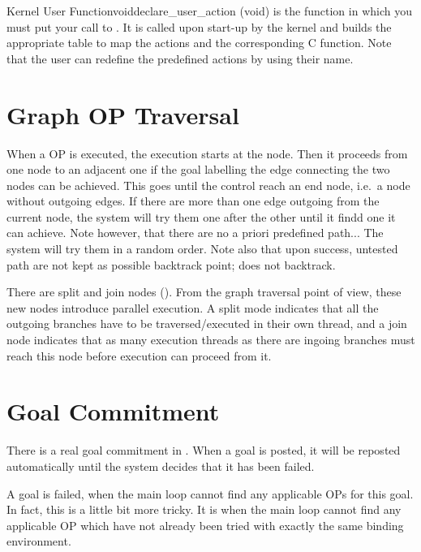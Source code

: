 \begin{typefn}{Kernel User Function}{void}{declare\_user\_action} {(void)}
is the function in which you must put your call to
. It is called upon start-up by the kernel and
builds the appropriate table to map the actions and the corresponding C
function.  Note that the user can redefine the predefined actions by using
their name.
\end{typefn}

\section{Graph OP Traversal}

When a OP is executed, the execution starts at the  node.
Then it proceeds from one node to an adjacent one if the goal labelling
the edge connecting the two nodes can be achieved. This goes until the
control reach an end node, i.e.\ a node without outgoing edges. If there
are more than one edge outgoing from the current node, the system will
try them one after the other until it findd one it can achieve. Note
however, that there are no a priori predefined path... The system will
try them in a random order. Note also that upon success, untested path
are not kept as possible backtrack point; \CPK{} does not backtrack.

There are split and join nodes ().  From the graph traversal point of view, these new nodes introduce
parallel execution. A split mode indicates that all the outgoing branches have
to be traversed/executed in their own thread, and a join node indicates that as
many execution threads as there are ingoing branches must reach this node
before execution can proceed from it.


\section{Goal Commitment}

There is a real goal commitment in \COPRS{}. When a goal is posted, it will be
reposted automatically until the system decides that it has been failed.

A goal is failed, when the main loop cannot find any applicable OPs
for this goal. In fact, this is a little bit more tricky. It is when the
main loop cannot find any applicable OP which have not already been tried
with exactly the same binding environment.

